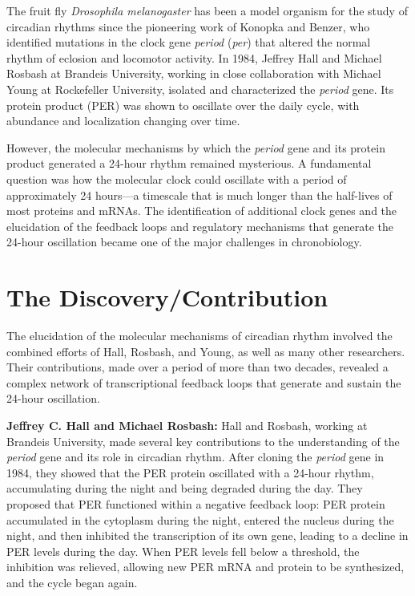 The fruit fly \textit{Drosophila melanogaster} has been a model organism for the study of circadian rhythms since the pioneering work of Konopka and Benzer, who identified mutations in the clock gene \textit{period} (\textit{per}) that altered the normal rhythm of eclosion and locomotor activity. In 1984, Jeffrey Hall and Michael Rosbash at Brandeis University, working in close collaboration with Michael Young at Rockefeller University, isolated and characterized the \textit{period} gene. Its protein product (PER) was shown to oscillate over the daily cycle, with abundance and localization changing over time.

However, the molecular mechanisms by which the \textit{period} gene and its protein product generated a 24-hour rhythm remained mysterious. A fundamental question was how the molecular clock could oscillate with a period of approximately 24 hours---a timescale that is much longer than the half-lives of most proteins and mRNAs. The identification of additional clock genes and the elucidation of the feedback loops and regulatory mechanisms that generate the 24-hour oscillation became one of the major challenges in chronobiology.

\section{The Discovery/Contribution}

The elucidation of the molecular mechanisms of circadian rhythm involved the combined efforts of Hall, Rosbash, and Young, as well as many other researchers. Their contributions, made over a period of more than two decades, revealed a complex network of transcriptional feedback loops that generate and sustain the 24-hour oscillation.

\textbf{Jeffrey C. Hall and Michael Rosbash:} Hall and Rosbash, working at Brandeis University, made several key contributions to the understanding of the \textit{period} gene and its role in circadian rhythm. After cloning the \textit{period} gene in 1984, they showed that the PER protein oscillated with a 24-hour rhythm, accumulating during the night and being degraded during the day. They proposed that PER functioned within a negative feedback loop: PER protein accumulated in the cytoplasm during the night, entered the nucleus during the night, and then inhibited the transcription of its own gene, leading to a decline in PER levels during the day. When PER levels fell below a threshold, the inhibition was relieved, allowing new PER mRNA and protein to be synthesized, and the cycle began again.

